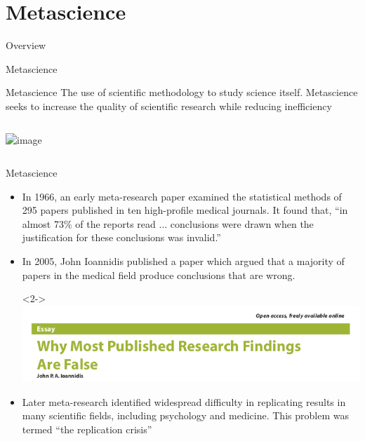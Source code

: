 \documentclass{beamer}
\begin{document}
\section{Metascience}
\begin{frame}{Overview}
\end{frame}
\begin{frame}{Metascience}
	\begin{block}{Metascience}
		The use of scientific methodology to study science itself. Metascience seeks to increase the quality of scientific research while reducing inefficiency
	\end{block}

	\begin{columns}
		\begin{center}
		\includegraphics<2->[width=.7\textwidth]{../images/John_Ioannidis.jpg}
		\end{center}
	\end{columns}
\end{frame}

\begin{frame}{Metascience}
	\begin{itemize}
		\item<1-> In 1966, an early meta-research paper examined the statistical methods of 295 papers published in ten high-profile medical journals. It found that, ``in almost 73\% of the reports read ... conclusions were drawn when the justification for these conclusions was invalid.''
		\item<2-> In 2005, John Ioannidis published a paper which argued that a majority of papers in the medical field produce conclusions that are wrong.\\
		\item[]<2-> \includegraphics[width=.7\textwidth]{../images/moststudiesfalse.png}
		\item<3-> Later meta-research identified widespread difficulty in replicating results in many scientific fields, including psychology and medicine. This problem was termed ``the replication crisis''
	\end{itemize}
\end{frame}
\end{document}
